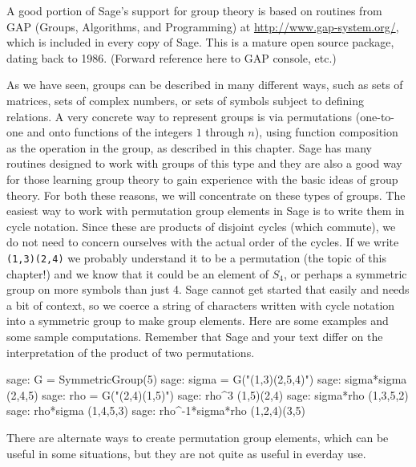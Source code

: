 A good portion of Sage's support for group theory is based on routines from GAP (Groups, Algorithms, and Programming) at \url{http://www.gap-system.org/}, which is included in every copy of Sage.  This is a mature open source package, dating back to 1986. (Forward reference here to GAP console, etc.)\par
%
As we have seen, groups can be described in many different ways, such as sets of matrices, sets of complex numbers, or sets of symbols subject to defining relations.  A very concrete
way to represent groups is via permutations (one-to-one and onto functions of the integers $1$ through $n$), using function composition as the operation in the group, as described in this chapter.  Sage has many routines designed to work with groups of this type and they are also a good way for those learning group theory to gain experience with the basic ideas of group theory.  For both these reasons, we will concentrate on these types of groups.
%
%
The easiest way to work with permutation group elements in Sage is to write them in cycle notation.  Since these are products of disjoint cycles (which commute), we do not need to concern ourselves with the actual order of the cycles.  If we write \verb?(1,3)(2,4)? we probably understand it to be a permutation (the topic of this chapter!) and we know that it could be an element of $S_4$, or perhaps a symmetric group on more symbols than just 4.  Sage cannot get started that easily and needs a bit of context, so we coerce a string of characters written with cycle notation into a symmetric group to make group elements.  Here are some examples and some sample computations.  Remember that Sage and your text differ on the interpretation of the product of two permutations.
%
\begin{sageexample}
sage: G = SymmetricGroup(5)
sage: sigma = G("(1,3)(2,5,4)")
sage: sigma*sigma
(2,4,5)
sage: rho = G("(2,4)(1,5)")
sage: rho^3
(1,5)(2,4)
sage: sigma*rho
(1,3,5,2)
sage: rho*sigma
(1,4,5,3)
sage: rho^-1*sigma*rho
(1,2,4)(3,5)
\end{sageexample}
%
There are alternate ways to create permutation group elements, which can be useful in some situations, but they are not quite as useful in everday use.
